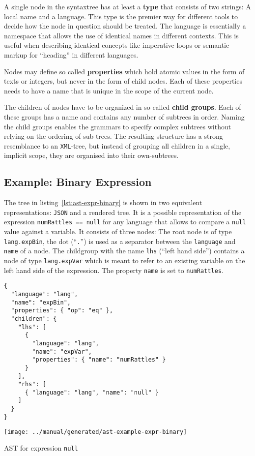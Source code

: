 \documentclass[sigconf,review=true]{acmart}
\newcommand\astScale{0.75}
\begin{document}
A single node in the syntaxtree has at least a \textbf{type} that consists of two strings: A local name and a language. This type is the premier way for different tools to decide how the node in question should be treated. The language is essentially a namespace that allows the use of identical names in different contexts. This is useful when describing identical concepts like imperative loops or semantic markup for \enquote{heading} in different languages.

Nodes may define so called \textbf{properties} which hold atomic values in the form of texts or integers, but never in the form of child nodes. Each of these properties needs to have a name that is unique in the scope of the current node.

The children of nodes have to be organized in so called \textbf{child groups}. Each of these groups has a name and contains any number of subtrees in order. Naming the child groups enables the grammars to specify complex subtrees without relying on the ordering of sub-trees. The resulting structure has a strong resemblance to an \texttt{XML}-tree, but instead of grouping all children in a single, implicit scope, they are organised into their own-subtrees.

\subsection{Example: Binary Expression}

The tree in listing~\ref{lst:ast-expr-binary} is shown in two equivalent representations: \texttt{JSON} and a rendered tree. It is a possible representation of the expression \texttt{numRattles == null} for any language that allows to compare a \texttt{null} value against a variable. It consists of three nodes: The root node is of type \texttt{lang.expBin}, the dot (\enquote{\texttt{.}}) is used as a separator between the \texttt{language} and \texttt{name} of a node. The childgroup with the name \texttt{lhs} (\enquote{left hand side}) contains a node of type \texttt{lang.expVar} which is meant to refer to an existing variable on the left hand side of the expression. The property \texttt{name} is set to \texttt{numRattles}.

\begin{listing}[H]
\begin{verbatim}
{
  "language": "lang",
  "name": "expBin",
  "properties": { "op": "eq" },
  "children": {
    "lhs": [
      {
        "language": "lang",
        "name": "expVar",
        "properties": { "name": "numRattles" }
      }
    ],
    "rhs": [
      { "language": "lang", "name": "null" }
    ]
  }
}
\end{verbatim}
\texttt{[image: ../manual/generated/ast-example-expr-binary]}
\caption{AST for expression \texttt{null}}
\label{lst:ast-expr-binary}
\end{listing}
\end{document}
